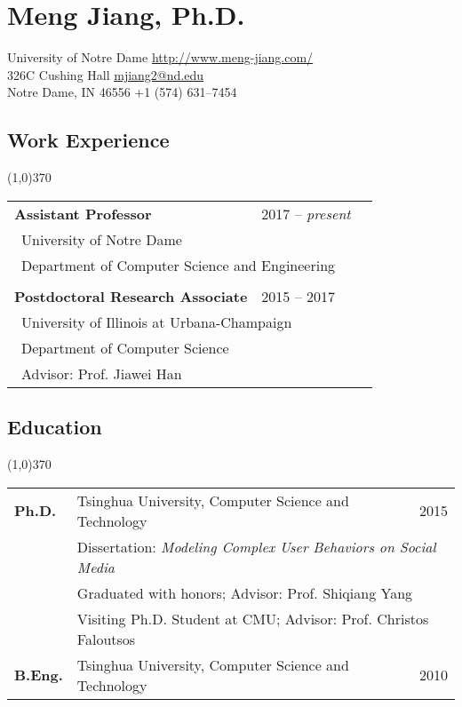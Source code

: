 \documentclass[10pt]{article}
\begin{document}
\setcounter{secnumdepth}{0}

\thispagestyle{firststyle}

\section{\LARGE{\sc Meng Jiang, Ph.D.}}
University of Notre Dame \hfill \url{http://www.meng-jiang.com/} \\
326C Cushing Hall \hfill \url{mjiang2@nd.edu}\\
Notre Dame, IN 46556 \hfill +1 (574) 631--7454

\subsection{\sc Work Experience}
\vspace{-0.4cm} \line(1,0){370} \vspace{0.1cm}

\begin{table}[h!]
\begin{tabular*}{12.7cm}{p{10.0cm}p{3.25cm}r}
\bf{Assistant Professor}&2017 -- \textit{present}\\
 \multicolumn{2}{l}{~{University of Notre Dame}}\\
 \multicolumn{2}{l}{~{Department of Computer Science and Engineering}}\\
\\
\bf{Postdoctoral Research Associate}&2015 -- 2017\\
 \multicolumn{2}{l}{~{University of Illinois at Urbana-Champaign}}\\
 \multicolumn{2}{l}{~{Department of Computer Science}} \\
 \multicolumn{2}{l}{~{Advisor: Prof. Jiawei Han}} \\	
\end{tabular*}
\end{table}
\vspace{-0.4cm}

\vspace{-0.2cm}
\subsection{\sc Education}
\vspace{-0.4cm} \line(1,0){370} \vspace{-0.1cm}

\begin{table}[h!]
\begin{tabular*}{12.7cm}{p{1.15cm}p{10.00cm}r}
\bf{Ph.D.}&Tsinghua University, Computer Science and Technology&2015\\
 &\multicolumn{2}{l}{Dissertation: \textit{Modeling Complex User Behaviors on Social Media}}\\
 &\multicolumn{2}{l}{Graduated with honors; Advisor: Prof. Shiqiang Yang}\\
 &\multicolumn{2}{l}{Visiting Ph.D. Student at CMU; Advisor: Prof. Christos Faloutsos}\\	
\bf{B.Eng.}&Tsinghua University, Computer Science and Technology&2010

\end{tabular*}
\end{table}
\end{document}
